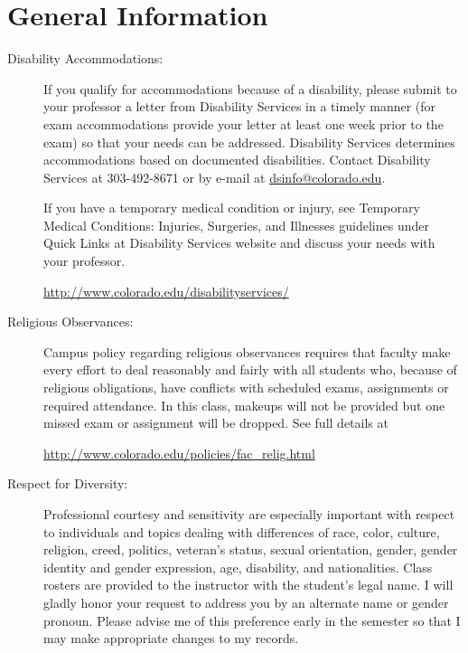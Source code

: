 \documentclass[11pt]{article}
\begin{document}
\section*{General Information}
\begin{description}
\item[Disability Accommodations:] If you qualify for accommodations
  because of a disability, please submit to your professor a letter
  from Disability Services in a timely manner (for exam accommodations
  provide your letter at least one week prior to the exam) so that
  your needs can be addressed. Disability Services determines
  accommodations based on documented disabilities. Contact Disability
  Services at 303-492-8671 or by e-mail at
  \href{mailto:dsinfo@colorado.edu}{dsinfo@colorado.edu}.

  If you have a temporary medical condition or injury, see Temporary
  Medical Conditions: Injuries, Surgeries, and Illnesses guidelines
  under Quick Links at Disability Services website and discuss your
  needs with your professor.
  \begin{center}
    \url{http://www.colorado.edu/disabilityservices/}
  \end{center}

\item[Religious Observances:] Campus policy regarding religious
  observances requires that faculty make every effort to deal
  reasonably and fairly with all students who, because of religious
  obligations, have conflicts with scheduled exams, assignments or
  required attendance.  In this class, makeups will not be provided
  but one missed exam or assignment will be dropped.  See full details
  at
  \begin{center}
    \url{http://www.colorado.edu/policies/fac_relig.html}
  \end{center}

\item[Respect for Diversity:] Professional courtesy and sensitivity
  are especially important with respect to individuals and topics
  dealing with differences of race, color, culture, religion, creed,
  politics, veteran's status, sexual orientation, gender, gender
  identity and gender expression, age, disability, and nationalities.
  Class rosters are provided to the instructor with the student's
  legal name. I will gladly honor your request to address you by an
  alternate name or gender pronoun. Please advise me of this
  preference early in the semester so that I may make appropriate
  changes to my records.


\end{description}
\end{document}
